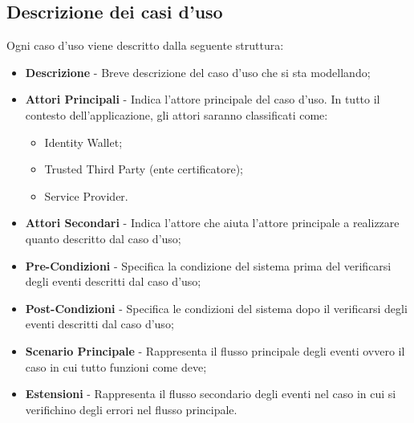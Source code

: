 \subsection{Descrizione dei casi d'uso}
Ogni caso d'uso viene descritto dalla seguente struttura:
\begin{itemize}
	\item \textbf{Descrizione} - Breve descrizione del caso d'uso che si sta modellando;
	\item \textbf{Attori Principali} - Indica l'attore principale del caso d'uso. In tutto il contesto dell'applicazione, gli attori saranno classificati come:
	\begin{itemize}
		\item Identity Wallet;
		\item Trusted Third Party (ente certificatore);
		\item Service Provider.
	\end{itemize}
	\item \textbf{Attori Secondari} - Indica l'attore che aiuta l'attore principale a realizzare quanto descritto dal caso d'uso;
	\item \textbf{Pre-Condizioni} - Specifica la condizione del sistema prima del verificarsi degli eventi descritti dal caso d'uso;
	\item \textbf{Post-Condizioni} - Specifica le condizioni del sistema dopo il verificarsi degli eventi descritti dal caso d'uso;
	\item \textbf{Scenario Principale} - Rappresenta il flusso principale degli eventi ovvero il caso in cui tutto funzioni come deve;
	\item \textbf{Estensioni} - Rappresenta il flusso secondario degli eventi nel caso in cui si verifichino degli errori nel flusso principale.
\end{itemize}
\newpage
